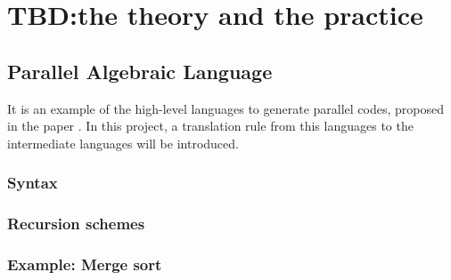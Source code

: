 \chapter{TBD:the theory and the practice}
\section{Parallel Algebraic Language} \label{b:pal}
It is an example of the high-level languages to generate parallel codes, proposed in the paper \cite{authorAlgebraicMultipartyProtocol2018}. In this project, a translation rule from this languages to the intermediate languages will be introduced.
\subsection{Syntax}
\subsection{Recursion schemes}
\subsection{Example: Merge sort}